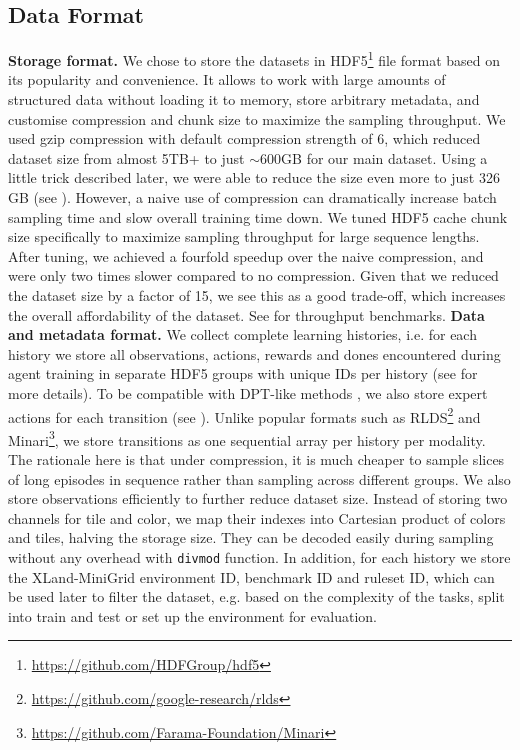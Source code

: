 \documentclass{article}
\begin{document}
\subsection{Data Format}
\textbf{Storage format.} We chose to store the datasets in HDF5\footnote{\url{https://github.com/HDFGroup/hdf5}} file format based on its popularity and convenience. It allows to work with large amounts of structured data without loading it to memory, store arbitrary metadata, and customise compression and chunk size to maximize the sampling throughput. We used gzip compression with default compression strength of 6, which reduced dataset size from almost 5TB+ to just $\sim$600GB for our main dataset. Using a little trick described later, we were able to reduce the size even more to just 326 GB (see ). However, a naive use of compression can dramatically increase batch sampling time and slow overall training time down. We tuned HDF5 cache chunk size specifically to maximize sampling throughput for large sequence lengths. After tuning, we achieved a fourfold speedup over the naive compression, and were only two times slower compared to no compression. Given that we reduced the dataset size by a factor of 15, we see this as a good trade-off, which increases the overall affordability of the dataset. See  for throughput benchmarks.
\textbf{Data and metadata format.} We collect complete learning histories, i.e. for each history we store all observations, actions, rewards and dones encountered during agent training in separate HDF5 groups with unique IDs per history (see  for more details). To be compatible with DPT-like methods \citep{lee2023supervised}, we also store expert actions for each transition (see ). Unlike popular formats such as RLDS\footnote{\url{https://github.com/google-research/rlds}} and Minari\footnote{\url{https://github.com/Farama-Foundation/Minari}}, we store transitions as one sequential array per history per modality. The rationale here is that under compression, it is much cheaper to sample slices of long episodes in sequence rather than sampling across different groups.
We also store observations efficiently to further reduce dataset size. Instead of storing two channels for tile and color, we map their indexes into Cartesian product of colors and tiles, halving the storage size. They can be decoded easily during sampling without any overhead with \texttt{divmod} function. In addition, for each history we store the XLand-MiniGrid environment ID, benchmark ID and ruleset ID, which can be used later to filter the dataset, e.g. based on the complexity of the tasks, split into train and test or set up the environment for evaluation.
\end{document}
